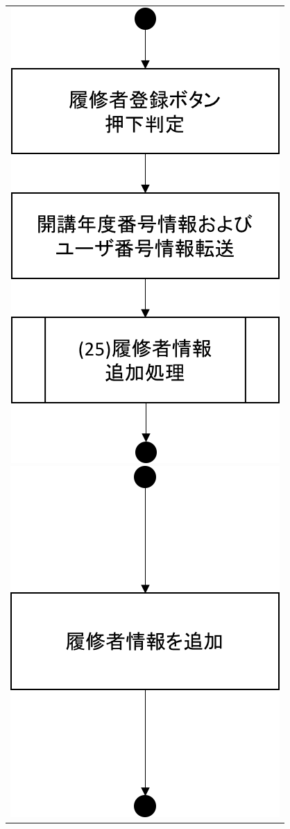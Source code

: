 \begin{figure}[htbp]
\begin{tabular}{c}
\begin{minipage}{0.33\hsize}
\begin{center}
   \includegraphics[width=0.8\linewidth,clip]{./img/flow/24.png}
  \end{center}
 \end{minipage}
 \begin{minipage}{0.33\hsize}
  \begin{center}
   \includegraphics[width=0.8\linewidth,clip]{./img/flow/25.png}

\end{center}
\end{minipage}
\end{tabular}
\end{figure}
